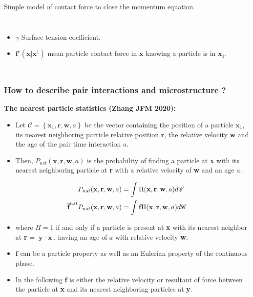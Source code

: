 \documentclass{sintefbeamer}
\begin{document}
\begin{frame}{Simple model of contact force to close the momentum equation.}
\begin{columns}
\begin{itemize}
  \item $\gamma$ Surface tension coefficient.  
  \item $\textbf{f}^c(\textbf{x}| \textbf{x}^1)$ mean particle contact force in $\textbf{x}$ knowing a particle is in $\textbf{x}_1$. 
\end{itemize}
\end{columns}


\end{frame}

\begin{frame}
  \frametitle{How to describe pair interactions and microstructure ?}
  
  \textbf{The nearest particle statistics (Zhang JFM 2020): }
  \begin{definition}
    \begin{itemize}
      \item Let $\mathscr{C} =\left\{\textbf{x}_1, \textbf{r}, \textbf{w},a\right\}$ be the vector containing the position of a particle $\textbf{x}_1$, its nearest neighboring particle relative position $\textbf{r}$, the relative velocity \textbf{w} and the age of the pair time interaction $a$.
      \item Then, $P_{nst}(\textbf{x},\textbf{r},\textbf{w},a) $ is the probability of finding a particle at \textbf{x} with its nearest neighboring particle at \textbf{r} with a relative velocity of \textbf{w} and an age $a$. 
    \end{itemize}
  \end{definition}
  \begin{align*}
    P_{nst}(\textbf{x},\textbf{r},\textbf{w},a)
    &= \int \Pi(\textbf{x},\textbf{r},\textbf{w},a) d\mathscr{C}\\
    \overline{\textbf{f}}^{nst} P_{nst}(\textbf{x},\textbf{r},\textbf{w},a)
    &= \int \textbf{f} \Pi(\textbf{x},\textbf{r},\textbf{w},a) d\mathscr{C}
  \end{align*}
  \footnotesize
  \begin{itemize}
    \item 
    where $\Pi = 1$ if and only if a particle is present at \textbf{x} with its nearest neighbor at \textbf{r} = $\textbf{y}-\textbf{x}$, having an age of $a$ with relative velocity \textbf{w}. 
    \item $\textbf{f}$ can be a particle property as well as an Eulerian property of the continuous phase. 
    \item In the following $\textbf{f}$ is either the relative velocity or resultant of force between the particle at \textbf{x} and its nearest neighboring particles at \textbf{y}. 
  \end{itemize}
\end{frame}
\end{document}

